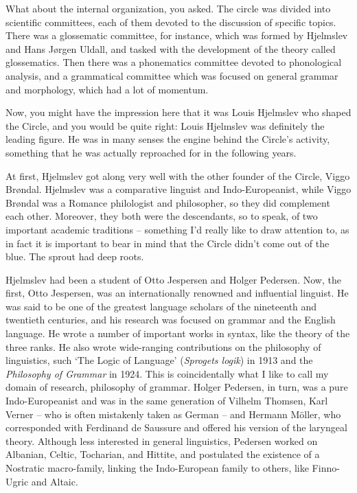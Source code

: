 \documentclass[output=paper]{langscibook}
\begin{document}
What about the internal organization, you asked. The circle was divided into scientific committees, each of them devoted to the discussion of specific topics. There was a glossematic committee, for instance, which was formed by Hjelmslev and Hans Jørgen Uldall, and tasked with the development of the theory called glossematics. Then there was a phonematics committee devoted to phonological analysis, and a grammatical committee which was focused on general grammar and morphology, which had a lot of momentum. 

Now, you might have the impression here that it was Louis Hjelmslev who shaped the Circle, and you would be quite right: Louis Hjelmslev was definitely the leading figure. He was in many senses the engine behind the Circle’s activity, something that he was actually reproached for in the following years. 

At first, Hjelmslev got along very well with the other founder of the Circle, Viggo Brøndal. Hjelmslev was a comparative linguist and Indo-Europeanist, while Viggo Brøndal was a Romance philologist and philosopher, so they did complement each other. Moreover, they both were the descendants, so to speak, of two important academic traditions – something I’d really like to draw attention to, as in fact it is important to bear in mind that the Circle didn’t come out of the blue. The sprout had deep roots. 

Hjelmslev had been a student of Otto Jespersen and Holger Pedersen. Now, the first, Otto Jespersen, was an internationally renowned and influential linguist. He was said to be one of the greatest language scholars of the nineteenth and twentieth centuries, and his research was focused on grammar and the English language. He wrote a number of important works in syntax, like the theory of the three ranks. He also wrote wide-ranging contributions on the philosophy of linguistics, such ‘The Logic of Language’ (\textit{Sprogets logik}) in 1913 and the \textit{Philosophy of Grammar} in 1924. This is coincidentally what I like to call my domain of research, philosophy of grammar. Holger Pedersen, in turn, was a pure Indo-Europeanist and was in the same generation of Vilhelm Thomsen, Karl Verner – who is often mistakenly taken as German – and Hermann Möller, who corresponded with Ferdinand de Saussure and offered his version of the laryngeal theory. Although less interested in general linguistics, Pedersen worked on Albanian, Celtic, Tocharian, and Hittite, and postulated the existence of a Nostratic macro-family, linking the Indo-European family to others, like Finno-Ugric and Altaic. 
\end{document}
